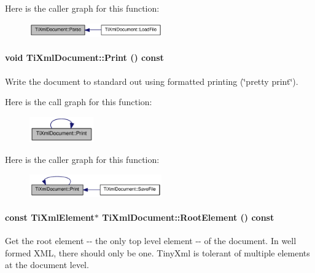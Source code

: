 Here is the caller graph for this function:\nopagebreak
\begin{figure}[H]
\begin{center}
\leavevmode
\includegraphics[width=162pt]{class_ti_xml_document_a789ad2f06f93d52bdb5570b2f3670289_icgraph}
\end{center}
\end{figure}
\hypertarget{class_ti_xml_document_af08389ec70ee9b2de7f800e206a18510}{
\paragraph[{Print}]{\setlength{\rightskip}{0pt plus 5cm}void TiXmlDocument::Print () const}\hfill}
\label{class_ti_xml_document_af08389ec70ee9b2de7f800e206a18510}
Write the document to standard out using formatted printing (\char`\"{}pretty print\char`\"{}). 

Here is the call graph for this function:\nopagebreak
\begin{figure}[H]
\begin{center}
\leavevmode
\includegraphics[width=78pt]{class_ti_xml_document_af08389ec70ee9b2de7f800e206a18510_cgraph}
\end{center}
\end{figure}


Here is the caller graph for this function:\nopagebreak
\begin{figure}[H]
\begin{center}
\leavevmode
\includegraphics[width=161pt]{class_ti_xml_document_af08389ec70ee9b2de7f800e206a18510_icgraph}
\end{center}
\end{figure}
\hypertarget{class_ti_xml_document_ad09d17927f908f40efb406af2fb873be}{
\paragraph[{RootElement}]{\setlength{\rightskip}{0pt plus 5cm}const {\bf TiXmlElement}$\ast$ TiXmlDocument::RootElement () const}\hfill}
\label{class_ti_xml_document_ad09d17927f908f40efb406af2fb873be}
Get the root element -\/-\/ the only top level element -\/-\/ of the document. In well formed XML, there should only be one. TinyXml is tolerant of multiple elements at the document level. 

